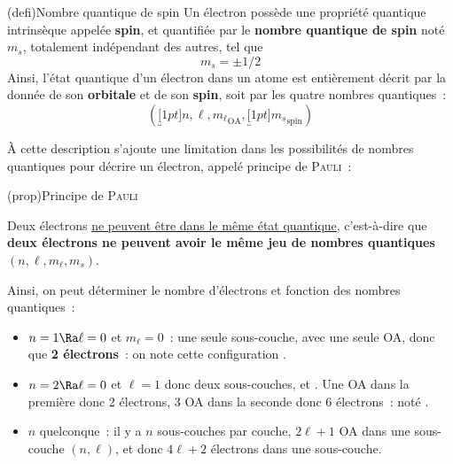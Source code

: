 \documentclass[../../main/main.tex]{subfiles}
\begin{document}
\begin{tcb*}(defi){Nombre quantique de spin}
	Un électron possède une propriété quantique intrinsèque appelée
	\textbf{spin}, et quantifiée par le \textbf{nombre quantique de spin} noté
	$m_s$, totalement indépendant des autres, tel que
	\[m_s = \pm 1/2\]
	Ainsi, l'état quantique d'un électron dans un atome est entièrement décrit
	par la donnée de son \textbf{orbitale} et de son \textbf{spin}, soit par les
	quatre nombres quantiques~:
	\[
		\boxed{(\underbracket[1pt]{n,\ell,m_\ell}_{\text{OA}},
		\underbracket[1pt]{m_s}_{\text{spin}})}
	\]
\end{tcb*}

À cette description s'ajoute une limitation dans les possibilités de nombres
quantiques pour décrire un électron, appelé principe de \textsc{Pauli}~:

\begin{tcb*}(prop){Principe de \textsc{Pauli}}
	\begin{center}
		Deux électrons \ul{ne peuvent être dans le même état quantique},
		c'est-à-dire que \textbf{deux électrons ne peuvent avoir le même jeu de
			nombres quantiques} $(n,\ell,m_\ell,m_s)$.
	\end{center}
\end{tcb*}

Ainsi, on peut déterminer le nombre d'électrons et fonction des nombres
quantiques~:
\begin{itemize}
	\item $n = 1 \Ra \ell = 0$ et $m_\ell = 0$~: une seule
	      sous-couche,  avec une seule OA, donc que \textbf{2
		      électrons}~: on note cette configuration .
	\item $n = 2 \Ra \ell = 0$ et $\ell = 1$ donc deux sous-couches,  et
	      . Une OA dans la première donc 2 électrons, 3 OA dans la
	      seconde donc 6 électrons~: noté .
	\item $n$ quelconque~: il y a $n$ sous-couches par couche, $2\ell+1$ OA
	      dans une sous-couche $(n,\ell)$, et donc $4\ell+2$ électrons dans une
	      sous-couche.
\end{itemize} \smallbreak
\end{document}
